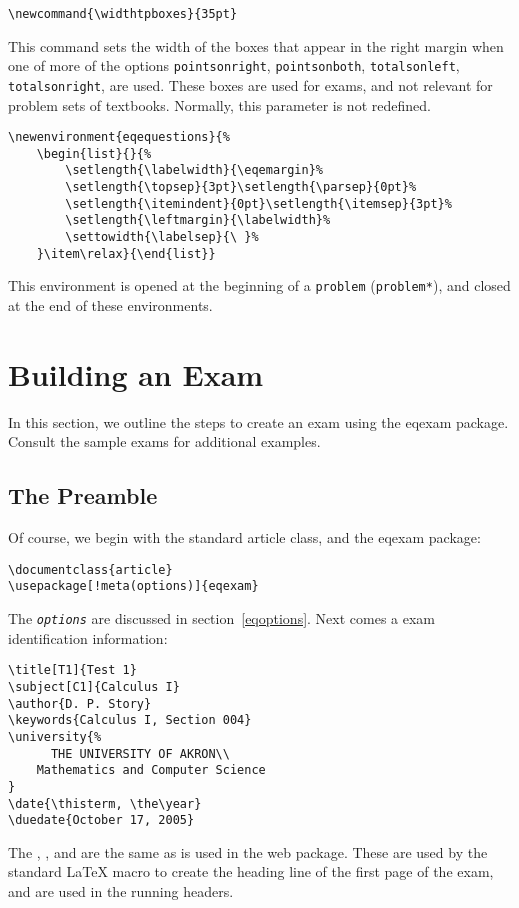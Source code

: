 \documentclass{article}
\edef\amtIndent{\the\parindent}
\def\meta#1{\textit{\texttt{#1}}}
\begin{document}
\begin{Verbatim}[xleftmargin=\amtIndent,fontsize=\fontsize{9}{11}\selectfont]
\newcommand{\widthtpboxes}{35pt}
\end{Verbatim}
This command sets the width of the boxes that appear in the right margin
when one of more of the options \texttt{pointsonright},
\texttt{pointsonboth}, \texttt{totalsonleft}, \texttt{totalsonright}, are
used. These boxes are used for exams, and not relevant for problem sets of
textbooks. Normally, this parameter is not redefined.

\begin{Verbatim}[xleftmargin=\amtIndent,fontsize=\fontsize{9}{11}\selectfont]
\newenvironment{eqequestions}{%
    \begin{list}{}{%
        \setlength{\labelwidth}{\eqemargin}%
        \setlength{\topsep}{3pt}\setlength{\parsep}{0pt}%
        \setlength{\itemindent}{0pt}\setlength{\itemsep}{3pt}%
        \setlength{\leftmargin}{\labelwidth}%
        \settowidth{\labelsep}{\ }%
    }\item\relax}{\end{list}}
\end{Verbatim}
This environment is opened at the beginning of a \texttt{problem}
(\texttt{problem*}), and closed at the end of these environments.

\section{Building an Exam}

In this section, we outline the steps to create an exam using the
\textsf{eqexam} package. Consult the sample exams for additional
examples.

\subsection{The Preamble}\label{preamble}

Of course, we begin with the standard article class, and the
\textsf{eqexam} package:
\begin{Verbatim}[xleftmargin=\amtIndent,commandchars=!()]
\documentclass{article}
\usepackage[!meta(options)]{eqexam}
\end{Verbatim}
\noindent The \meta{options} are discussed in
section~\ref{eqoptions}.  Next comes a exam identification
information:
\begin{Verbatim}[xleftmargin=\amtIndent,fontsize=\fontsize{9}{11}\selectfont]
\title[T1]{Test 1}
\subject[C1]{Calculus I}
\author{D. P. Story}
\keywords{Calculus I, Section 004}
\university{%
      THE UNIVERSITY OF AKRON\\
    Mathematics and Computer Science
}
\date{\thisterm, \the\year}
\duedate{October 17, 2005}
\end{Verbatim}
\noindent The , ,  and 
are the same as is used in the \textsf{web} package. These are
used by the standard {\LaTeX} macro to create the heading line of
the first page of the exam, and are used in the running headers.
\end{document}

